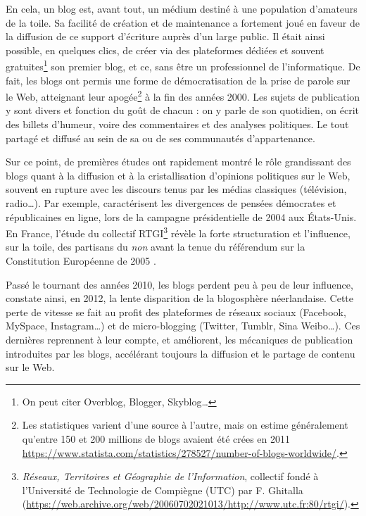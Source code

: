 \documentclass[symmetric,justified,marginals=raggedouter]{tufte-book}
\begin{document}
En cela, un blog est, avant tout, un médium destiné à une population d'ama\-teurs de la toile. Sa facilité de création et de maintenance a fortement joué en faveur de la diffusion de ce support d'écriture auprès d'un large public. Il était ainsi possible, en quelques clics, de créer via des plateformes dédiées et souvent gratuites\footnote{\RaggedOuter On peut citer Overblog, Blogger, Skyblog\ldots{}} son premier blog, et ce, sans être un professionnel de l'informatique. De fait, les blogs ont permis une forme de démocratisation de la prise de parole sur le Web, atteignant leur apogée\footnote{\RaggedOuter Les statistiques varient d'une source à l'autre, mais on estime généralement qu'entre 150 et 200 millions de blogs avaient été crées en 2011 \url{https://www.statista.com/statistics/278527/number-of-blogs-worldwide/}.} à la fin des années 2000. Les sujets de publication y sont divers et fonction du goût de chacun : on y parle de son quotidien, on écrit des billets d'humeur, voire des commentaires et des analyses politiques. Le tout partagé et diffusé au sein de sa ou de ses communautés d'appartenance.  

Sur ce point, de premières études ont rapidement montré le rôle grandissant des blogs quant à la diffusion et à la cristallisation d'opi\-nions politiques sur le Web, souvent en rupture avec les discours tenus par les médias classiques (télévision, radio\ldots{}). Par exemple, \citep{adamic_political_2005, adar_implicit_2004} caractérisent les divergences de pensées démocrates et républicaines en ligne, lors de la campagne présidentielle de 2004 aux États-Unis. En France, l'étude du collectif RTGI\footnote{\RaggedOuter \textit{Réseaux, Territoires et Géographie de l'Information}, collectif fondé à l'Université de Technologie de Compiègne (UTC) par F. Ghitalla (\url{https://web.archive.org/web/20060702021013/http://www.utc.fr:80/rtgi/}).} révèle la forte structuration et l'influence, sur la toile, des partisans du \textit{non} avant la tenue du référendum sur la Constitution Européenne de 2005 \citep{fouetillou_web_2008}. 

Passé le tournant des années 2010, les blogs perdent peu à peu de leur influence, \citep{weltevrede_where_2012} constate ainsi, en 2012, la lente disparition de la blogosphère néerlandaise. Cette perte de vitesse se fait au profit des plateformes de réseaux sociaux (Facebook, MySpace, Instagram\ldots{}) et de micro-blogging (Twitter, Tumblr, Sina Weibo\ldots{}). Ces dernières reprennent à leur compte, et améliorent, les mécaniques de publication introduites par les blogs, accélérant toujours la diffusion et le partage de contenu sur le Web.\\  
\end{document}

